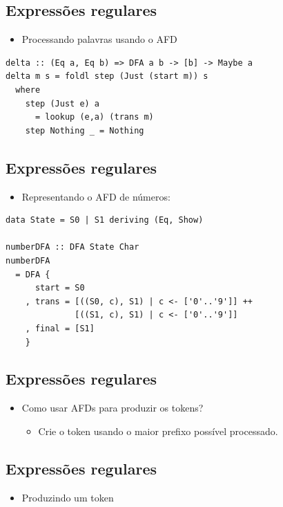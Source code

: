 \documentclass[11pt]{article}
\begin{document}
\subsection*{Expressões regulares}
\label{sec:org7195ef7}

\begin{itemize}
\item Processando palavras usando o AFD
\end{itemize}

\begin{verbatim}
delta :: (Eq a, Eq b) => DFA a b -> [b] -> Maybe a
delta m s = foldl step (Just (start m)) s
  where
    step (Just e) a
      = lookup (e,a) (trans m)
    step Nothing _ = Nothing
\end{verbatim}
\subsection*{Expressões regulares}
\label{sec:org4eb4da2}

\begin{itemize}
\item Representando o AFD de números:
\end{itemize}

\begin{verbatim}
data State = S0 | S1 deriving (Eq, Show)

numberDFA :: DFA State Char
numberDFA
  = DFA {
      start = S0
    , trans = [((S0, c), S1) | c <- ['0'..'9']] ++
              [((S1, c), S1) | c <- ['0'..'9']]
    , final = [S1]
    }
\end{verbatim}
\subsection*{Expressões regulares}
\label{sec:orgd40782b}

\begin{itemize}
\item Como usar AFDs para produzir os tokens?
\begin{itemize}
\item Crie o token usando o maior prefixo possível processado.
\end{itemize}
\end{itemize}
\subsection*{Expressões regulares}
\label{sec:orge99c4be}

\begin{itemize}
\item Produzindo um token
\end{itemize}
\end{document}

